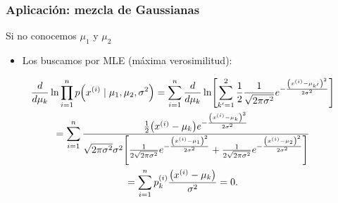 \documentclass[table]{beamer}
\begin{document}
\begin{frame}
    \frametitle{Aplicación: mezcla de Gaussianas}
    
    \begin{block}{Si no conocemos $\mu_{1}$ y $\mu_{2}$}
        \begin{itemize}
            \item Los buscamos por MLE (máxima verosimilitud):
        \end{itemize}
        \begin{multline*}
            \frac{d}{d \mu_{k}} \ln \prod_{i = 1}^{n} \pdf{x^{\parens{i}} \mid \mu_{1} , \mu_{2} , \sigma^{2}} = \sum_{i = 1}^{n} \frac{d}{d \mu_{k}} \ln \sparens{\sum_{k' = 1}^{2} \frac{1}{2} \frac{1}{\sqrt{2 \pi \sigma^{2}}} e^{- \frac{\parens{x^{\parens{i}} - \mu_{k'}}^{2}}{2 \sigma^{2}}}}
            \\
            = \sum_{i = 1}^{n} \frac{\frac{1}{2} \parens{x^{\parens{i}} - \mu_{k}} e^{- \frac{\parens{x^{\parens{i}} - \mu_{k}}^{2}}{2 \sigma^{2}}}}{\sqrt{2 \pi \sigma^{2}} \sigma^{2} \sparens{\frac{1}{2 \sqrt{2 \pi \sigma^{2}}} e^{- \frac{\parens{x^{\parens{i}} - \mu_{1}}^{2}}{2 \sigma^{2}}} + \frac{1}{2 \sqrt{2 \pi \sigma^{2}}} e^{- \frac{\parens{x^{\parens{i}} - \mu_{2}}^{2}}{2 \sigma^{2}}}}}
            \\
            = \sum_{i = 1}^{n} p^{\parens{i}}_{k} \frac{\parens{x^{\parens{i}} - \mu_{k}}}{\sigma^{2}}
            = 0
            .
        \end{multline*}
    \end{block}
\end{frame}
\end{document}
